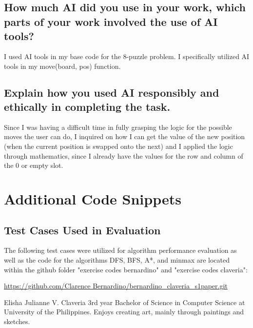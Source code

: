 \documentclass[journal]{./IEEE/IEEEtran}
\begin{document}
\subsection{How much AI did you use in your work, which parts of your work involved the use of AI tools?}
I used AI tools in my base code for the 8-puzzle problem. I specifically utilized AI tools in my move(board, pos) function.

\subsection{Explain how you used AI responsibly and ethically in completing the task.}
Since I was having a difficult time in fully grasping the logic for the possible moves the user can do, 
I inquired on how I can get the value of the new position (when the current position is swapped onto the next) 
and I applied the logic through mathematics, since I already have the values for the row and column of the 0 or 
empty slot.

\appendix

\section{Additional Code Snippets}
\subsection{Test Cases Used in Evaluation}
The following test cases were utilized for algorithm performance evaluation as well as the code for the algorithms DFS, BFS, A*, and minmax are located within the github folder "exercise codes bernardino" and "exercise codes claveria":

\url{https://github.com/Clarence Bernardino/bernardino_claveria_s1paper.git}






\begin{biography}{Elisha Julianne V. Claveria} 3rd year Bachelor of Science in Computer Science at University of the Philippines. Enjoys creating art, mainly through paintings and sketches.  
\end{biography}
\end{document}
